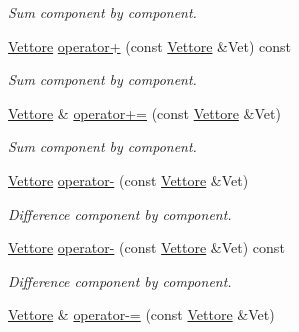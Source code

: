 \begin{DoxyCompactItemize}
\begin{DoxyCompactList}\small\item\em \-Sum component by component. \end{DoxyCompactList}\item 
\hypertarget{classVettore_a90957078ca1e1545f53a7067cf712421}{\hyperlink{classVettore}{\-Vettore} \hyperlink{classVettore_a90957078ca1e1545f53a7067cf712421}{operator+} (const \hyperlink{classVettore}{\-Vettore} \&\-Vet) const }\label{classVettore_a90957078ca1e1545f53a7067cf712421}

\begin{DoxyCompactList}\small\item\em \-Sum component by component. \end{DoxyCompactList}\item 
\hypertarget{classVettore_a51ea7bee6d49e4b483dc91a38a6bcbe6}{\hyperlink{classVettore}{\-Vettore} \& \hyperlink{classVettore_a51ea7bee6d49e4b483dc91a38a6bcbe6}{operator+=} (const \hyperlink{classVettore}{\-Vettore} \&\-Vet)}\label{classVettore_a51ea7bee6d49e4b483dc91a38a6bcbe6}

\begin{DoxyCompactList}\small\item\em \-Sum component by component. \end{DoxyCompactList}\item 
\hypertarget{classVettore_a8a8192a424c70ae12496037159ef2294}{\hyperlink{classVettore}{\-Vettore} \hyperlink{classVettore_a8a8192a424c70ae12496037159ef2294}{operator-\/} (const \hyperlink{classVettore}{\-Vettore} \&\-Vet)}\label{classVettore_a8a8192a424c70ae12496037159ef2294}

\begin{DoxyCompactList}\small\item\em \-Difference component by component. \end{DoxyCompactList}\item 
\hypertarget{classVettore_a36b8a08fa27542f550b9b59d08fa4a45}{\hyperlink{classVettore}{\-Vettore} \hyperlink{classVettore_a36b8a08fa27542f550b9b59d08fa4a45}{operator-\/} (const \hyperlink{classVettore}{\-Vettore} \&\-Vet) const }\label{classVettore_a36b8a08fa27542f550b9b59d08fa4a45}

\begin{DoxyCompactList}\small\item\em \-Difference component by component. \end{DoxyCompactList}\item 
\hypertarget{classVettore_a3550f84cde64fde6694c6ecc67e08dae}{\hyperlink{classVettore}{\-Vettore} \& \hyperlink{classVettore_a3550f84cde64fde6694c6ecc67e08dae}{operator-\/=} (const \hyperlink{classVettore}{\-Vettore} \&\-Vet)}\label{classVettore_a3550f84cde64fde6694c6ecc67e08dae}


\end{DoxyCompactItemize}
